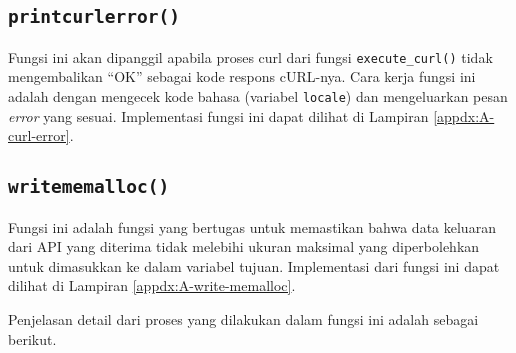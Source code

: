 \subsection{\texttt{print\textunderscore curl\textunderscore error()}}
\label{sec:testing-implementation-curl-error}

Fungsi ini akan dipanggil apabila proses curl dari fungsi \verb|execute_curl()| tidak mengembalikan ``OK'' sebagai kode respons cURL-nya. Cara kerja fungsi ini adalah dengan mengecek kode bahasa (variabel \verb|locale|) dan mengeluarkan pesan \textit{error} yang sesuai. Implementasi fungsi ini dapat dilihat di Lampiran \ref{appdx:A-curl-error}.
	
\subsection{\texttt{write\textunderscore memalloc()}}
\label{sec:testing-implementation-write-memalloc}

Fungsi ini adalah fungsi yang bertugas untuk memastikan bahwa data keluaran dari API yang diterima tidak melebihi ukuran maksimal yang diperbolehkan untuk dimasukkan ke dalam variabel tujuan. Implementasi dari fungsi ini dapat dilihat di Lampiran \ref{appdx:A-write-memalloc}.

Penjelasan detail dari proses yang dilakukan dalam fungsi ini adalah sebagai berikut.

